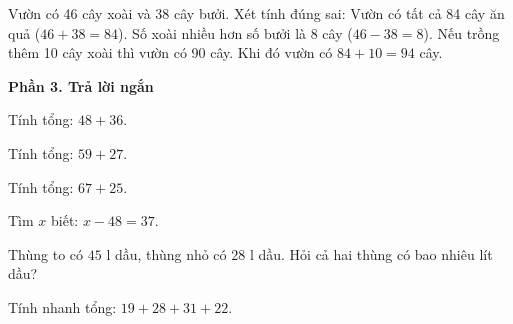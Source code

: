 \begin{ex} %
Vườn có 46 cây xoài và 38 cây bưởi. Xét tính đúng sai:
\choiceTF
{\True Vườn có tất cả 84 cây ăn quả ($46 + 38 = 84$).}
{\True Số xoài nhiều hơn số bưởi là 8 cây ($46 - 38 = 8$).}
{Nếu trồng thêm 10 cây xoài thì vườn có 90 cây.}
{\True Khi đó vườn có $84 + 10 = 94$ cây.}
\end{ex}

\textbf{Phần 3. Trả lời ngắn}

\begin{ex} %
Tính tổng: $48 + 36$.
\end{ex}

\begin{ex} %
Tính tổng: $59 + 27$.
\end{ex}

\begin{ex} %
Tính tổng: $67 + 25$.
\end{ex}

\begin{ex} %
Tìm $x$ biết: $x - 48 = 37$.
\end{ex}

\begin{ex} %
Thùng to có $45\text{ l}$ dầu, thùng nhỏ có $28\text{ l}$ dầu. Hỏi cả hai thùng có bao nhiêu lít dầu?
\end{ex}

\begin{ex} %
Tính nhanh tổng: $19 + 28 + 31 + 22$.
\end{ex}
